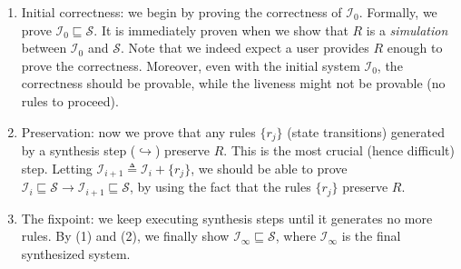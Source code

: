 \documentclass[format=manuscript]{acmart}
\begin{document}
\begin{enumerate}
\item Initial correctness: we begin by proving the correctness of
  $\mathcal{I}_0$. Formally, we prove $\mathcal{I}_0 \sqsubseteq
  \mathcal{S}$. It is immediately proven when we show that $R$ is a
  \emph{simulation} between $\mathcal{I}_0$ and $\mathcal{S}$. Note that we
  indeed expect a user provides $R$ enough to prove the correctness. Moreover,
  even with the initial system $\mathcal{I}_0$, the correctness should be
  provable, while the liveness might not be provable (no rules to proceed).
\item Preservation: now we prove that any rules $\{ r_j \}$ (state transitions)
  generated by a synthesis step ($\hookrightarrow$) preserve $R$. This is the
  most crucial (hence difficult) step. Letting $\mathcal{I}_{i+1} \triangleq
  \mathcal{I}_i + \{ r_j \}$, we should be able to prove $\mathcal{I}_i
  \sqsubseteq \mathcal{S} \to \mathcal{I}_{i+1} \sqsubseteq \mathcal{S}$, by
  using the fact that the rules $\{ r_j \}$ preserve $R$.
\item The fixpoint: we keep executing synthesis steps until it generates no more
  rules. By (1) and (2), we finally show $\mathcal{I}_\infty \sqsubseteq
  \mathcal{S}$, where $\mathcal{I}_\infty$ is the final synthesized system.
\end{enumerate}
\end{document}
